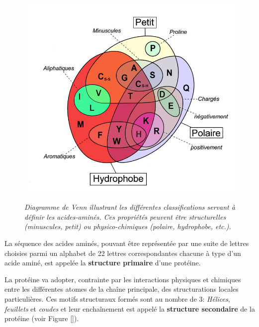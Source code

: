 \begin{figure}
  \centering
  {\includegraphics[width=0.75\linewidth]{./figures/ch1/diagramme_venn}}
    \caption{\it Diagramme de Venn illustrant les différentes classifications servant à définir les acides-aminés. Ces propriétés peuvent être structurelles (minuscules, petit) ou physico-chimiques (polaire, hydrophobe, etc.).}
    \label{Fig:diagramme_venn}
  \hspace{0.2cm}
\end{figure}




La séquence des acides aminés, pouvant être représentée par une suite de lettres choisies parmi un alphabet de 22 lettres correspondantes chacune à type d'un acide aminé, est appelée la \textbf{structure primaire} d'une protéine.

La protéine va adopter, contrainte par les interactions physiques et chimiques entre les différentes atomes de la chaîne principale, des structurations locales particulières. Ces motifs structuraux formés sont au nombre de 3: \textit{Hélices}, \textit{feuillets} et \textit{coudes} et leur enchaînement est appelé la \textbf{structure secondaire} de la protéine (voir Figure \ref{}).

